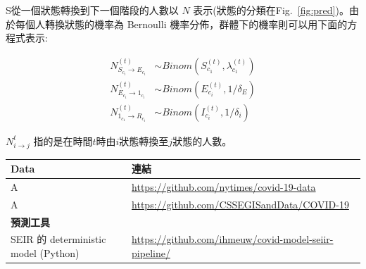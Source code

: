 \documentclass[12pt, a4paper]{article}
\begin{document}
\begin{tcolorbox}[title=隨機 SEIR 模型]
    S從一個狀態轉換到下一個階段的人數以 $N$ 表示(狀態的分類在Fig.~\ref{fig:pred})。由於每個人轉換狀態的機率為 Bernoulli 機率分佈，群體下的機率則可以用下面的方程式表示:
    
    \begin{align} 
        N^{(t)}_{S_{c_i}\rightarrow E_{c_i}} & \sim  Binom(S^{(t)}_{c_1},  \lambda^{(t)}_{c_1}) \label{eq:N_S2E}\\
        N^{(t)}_{E_{c_i}\rightarrow 1_{c_i}} & \sim Binom(E^{(t)}_{c_i}, 1/\delta_{E}) \\
        N^{(t)}_{1_{c_1}\rightarrow R_{c_i}} & \sim Binom(I^{(t)}_{c_i}, 1/ \delta_{i})  
    \end{align}
    
    $N^{t}_{i\rightarrow j}$ 指的是在時間$t$時由$i$狀態轉換至$j$狀態的人數。
\end{tcolorbox}


\begin{tabularx}{\linewidth}{ X  X   }
    \toprule
    
    \textbf{Data} & \textbf{連結}   \\ 

    \bottomrule
    
    A & \url{https://github.com/nytimes/covid-19-data}   \\ \hline
    A & \url{https://github.com/CSSEGISandData/COVID-19} \\ \hline
    \toprule
    \multicolumn{2}{l}{\textbf{預測工具}} \\ 
    \bottomrule
    SEIR 的 deterministic model (Python)\citep{mobility2020} & \url{https://github.com/ihmeuw/covid-model-seiir-pipeline/} \\ \hline
    \bottomrule
\end{tabularx}


\end{document}
